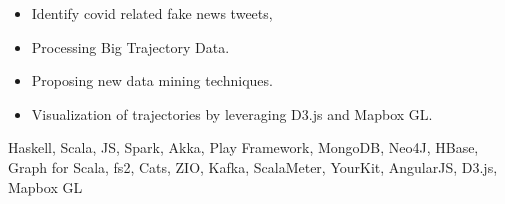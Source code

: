 \begin{experiences}
{\begin{itemize}
        \item Identify covid related fake news tweets,
        \item	Processing Big Trajectory Data.
        \item	Proposing new data mining techniques.
        \item	Visualization of trajectories by leveraging D3.js and Mapbox GL.                                
      \end{itemize}
    }{Haskell, Scala, JS, Spark, Akka, Play Framework, MongoDB, Neo4J, HBase, Graph for Scala, fs2, Cats, ZIO, Kafka, ScalaMeter, YourKit, AngularJS, D3.js, Mapbox GL}
  \emptySeparator
\end{experiences}